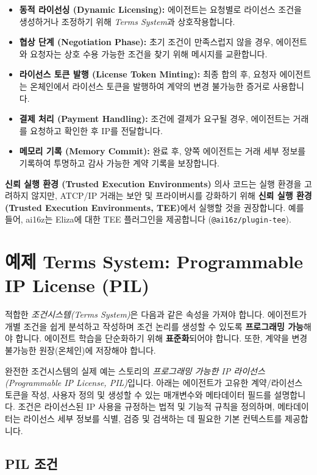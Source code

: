 \documentclass[journal,onecolumn]{IEEEtran} %
\begin{document}
\begin{itemize}
    \item \textbf{동적 라이선싱 (Dynamic Licensing):} 에이전트는 요청별로 라이선스 조건을 생성하거나 조정하기 위해 \textit{Terms System}과 상호작용합니다.
    \item \textbf{협상 단계 (Negotiation Phase):} 초기 조건이 만족스럽지 않을 경우, 에이전트와 요청자는 상호 수용 가능한 조건을 찾기 위해 메시지를 교환합니다.
    \item \textbf{라이선스 토큰 발행 (License Token Minting):} 최종 합의 후, 요청자 에이전트는 온체인에서 라이선스 토큰을 발행하여 계약의 변경 불가능한 증거로 사용합니다.
    \item \textbf{결제 처리 (Payment Handling):} 조건에 결제가 요구될 경우, 에이전트는 거래를 요청하고 확인한 후 IP를 전달합니다.
    \item \textbf{메모리 기록 (Memory Commit):} 완료 후, 양쪽 에이전트는 거래 세부 정보를 기록하여 투명하고 감사 가능한 계약 기록을 보장합니다.
\end{itemize}

\noindent\textbf{신뢰 실행 환경 (Trusted Execution Environments)}
의사 코드는 실행 환경을 고려하지 않지만, ATCP/IP 거래는 보안 및 프라이버시를 강화하기 위해 \textbf{신뢰 실행 환경 (Trusted Execution Environments, TEE)}에서 실행할 것을 권장합니다. 예를 들어, ai16z\cite{ref7}는 Eliza에 대한 TEE 플러그인을 제공합니다 (\texttt{@ai16z/plugin-tee}).

\section{예제 Terms System: Programmable IP License (PIL)}

적합한 \textit{조건시스템(Terms System)}은 다음과 같은 속성을 가져야 합니다. 에이전트가 개별 조건을 쉽게 분석하고 작성하며 조건 논리를 생성할 수 있도록 \textbf{프로그래밍 가능}해야 합니다. 에이전트 학습을 단순화하기 위해 \textbf{표준화}되어야 합니다. 또한, 계약을 변경 불가능한 원장(온체인)에 저장해야 합니다.

완전한 조건시스템의 실제 예는 스토리의 \textit{프로그래밍 가능한 IP 라이선스(Programmable IP License, PIL)}\cite{ref6}입니다. 아래는 에이전트가 고유한 계약/라이선스 토큰을 작성, 사용자 정의 및 생성할 수 있는 매개변수와 메타데이터 필드를 설명합니다. 조건은 라이선스된 IP 사용을 규정하는 법적 및 기능적 규칙을 정의하며, 메타데이터는 라이선스 세부 정보를 식별, 검증 및 검색하는 데 필요한 기본 컨텍스트를 제공합니다.

\subsection{PIL 조건}
\end{document}
